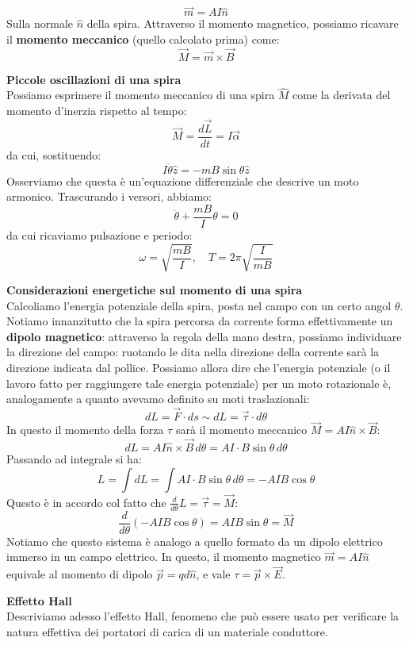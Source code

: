 \documentclass[a4paper,12pt]{article}
\begin{document}
$$ \vec{m} = AI\hat{n} $$
Sulla normale $\hat{n}$ della spira. Attraverso il momento magnetico, possiamo ricavare il \textbf{momento meccanico} (quello calcolato prima) come:
$$ \vec{M} = \vec{m} \times \vec{B} $$ 
\par\smallskip
\textbf{Piccole oscillazioni di una spira} \\
Possiamo esprimere il momento meccanico di una spira $\hat{M}$ come la derivata del momento d'inerzia rispetto al tempo:
$$ \vec{M} = \frac{d\vec{L}}{dt} = I\vec{\alpha} $$
da cui, sostituendo:
$$ I\ddot{\theta}\hat{z} = -mB\sin{\theta}\hat{z}$$
Osserviamo che questa è un'equazione differenziale che descrive un moto armonico. Trascurando i versori, abbiamo:
$$ \ddot{\theta} + \frac{mB}{I}\theta = 0 $$
da cui ricaviamo pulsazione e periodo:
$$ \omega = \sqrt{\frac{mB}{I}}, \quad T = 2\pi\sqrt{\frac{I}{mB}} $$
\par\smallskip
\textbf{Considerazioni energetiche sul momento di una spira} \\
Calcoliamo l'energia potenziale della spira, posta nel campo con un certo angol $\theta$. Notiamo innanzitutto che la spira percorsa da
corrente forma effettivamente un \textbf{dipolo magnetico}: attraverso la regola della mano destra, possiamo individuare la direzione del campo:
ruotando le dita nella direzione della corrente sarà la direzione indicata dal pollice. Possiamo allora dire che l'energia potenziale (o il lavoro
fatto per raggiungere tale energia potenziale) per un moto rotazionale è, analogamente a quanto avevamo definito su moti traslazionali:
$$ dL = \vec{F} \cdot ds \sim dL = \vec{\tau} \cdot d\theta $$
In questo il momento della forza $\tau$ sarà il momento meccanico $\vec{M} = AI\hat{n} \times \vec{B}$:
$$ dL = AI\hat{n} \times \vec{B} \, d\theta = AI \cdot B\sin{\theta} \, d\theta $$
Passando ad integrale si ha:
$$ L = \int dL = \int AI \cdot B\sin{\theta} \, d\theta = -AIB \cos{\theta} $$
Questo è in accordo col fatto che $\frac{d}{d\theta}L = \vec{\tau} = \vec{M}$:
$$ \frac{d}{d\theta} (-AIB\cos{\theta}) = AIB\sin{\theta} = \vec{M} $$
Notiamo che questo sistema è analogo a quello formato da un dipolo elettrico immerso in un campo elettrico. In questo,
il momento magnetico $\vec{m} = AI\hat{n}$ equivale al momento di dipolo $\vec{p} = qd\hat{n}$, e vale $\tau = \vec{p} \times \vec{E}$.
\par\smallskip
\textbf{Effetto Hall} \\
Descriviamo adesso l'effetto Hall, fenomeno che può essere usato per verificare la natura effettiva dei portatori di carica di un materiale conduttore.
\end{document}
